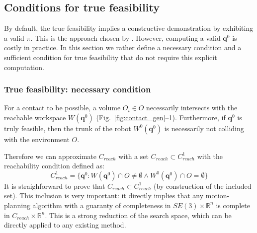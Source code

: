    
 
\subsection{Conditions for true feasibility}
By default, the true feasibility implies a constructive demonstration by exhibiting a valid $\pi$. This is the approach chosen by \cite{Bouyarmane2009}. However, computing a valid  $\mathbf{q}^{\overline{0}}$ is costly in practice. In this section we rather define a necessary condition and a sufficient condition for true feasibility that do not require this explicit computation.




\subsubsection*{True feasibility: necessary condition}
For a contact to be possible, a volume $O_i \in O$ necessarily intersects with the reachable workspace $W(\mathbf{q}^{0})$ (Fig.~\ref{fig:contact_gen}--1). Furthermore, if $\mathbf{q}^{0}$ is truly feasible, then the trunk of the robot $W^0(\mathbf{q}^{0})$ is necessarily not colliding  with the environment $O$.

Therefore we can approximate $C_{reach}$ with a set $C_{reach} \subset C_{reach}^1$ with the reachability condition defined as: 
\begin{equation}
C_{reach}^1 = \{ \mathbf{q}^0 : W(\mathbf{q}^{0}) \cap O \neq \emptyset \wedge W^0(\mathbf{q}^{0}) \cap O = \emptyset \} %
\end{equation}
It is straighforward to prove that  $C_{reach} \subset C_{reach}^1$ (by construction of the included set). 
This inclusion is very important: it directly implies that any motion-planning algorithm with a guaranty of completeness in $SE(3) \times \mathbb{R}^n$ is complete  in $C_{reach} \times \mathbb{R}^n$. This is a strong reduction of the search space, which can be directly applied to any existing method.
 
